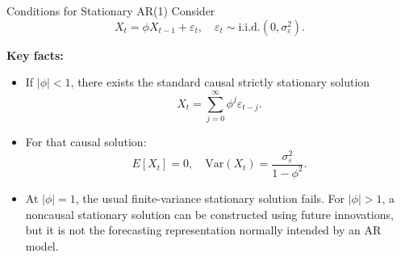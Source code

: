 \documentclass{beamer}
\begin{document}
\begin{frame}{Conditions for Stationary AR(1)}
  Consider
  \[
    X_t = \phi X_{t-1} + \varepsilon_t, \quad \varepsilon_t \sim \text{i.i.d.}(0, \sigma_\varepsilon^2).
  \]

  \vspace{0.3cm}
  \textbf{Key facts:}
  \begin{itemize}
    \item If $|\phi| < 1$, there exists the standard causal strictly stationary solution
      \[
        X_t = \sum_{j=0}^{\infty} \phi^j \varepsilon_{t-j}.
      \]
    \item For that causal solution:
      \[
        E[X_t] = 0, \quad
        \mathrm{Var}(X_t) = \frac{\sigma_\varepsilon^2}{1 - \phi^2}.
      \]
    \item At $|\phi|=1$, the usual finite-variance stationary solution fails. For $|\phi|>1$, a noncausal stationary solution can be constructed using future innovations, but it is not the forecasting representation normally intended by an AR model.
  \end{itemize}
\end{frame}
\end{document}
